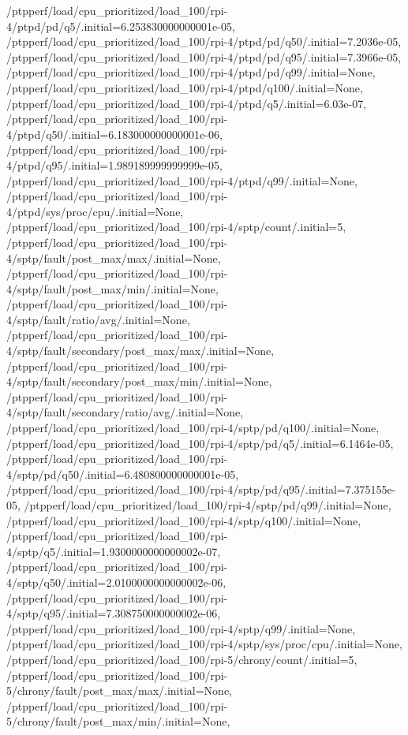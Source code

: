 {    /ptpperf/load/cpu_prioritized/load_100/rpi-4/ptpd/pd/q5/.initial=6.253830000000001e-05,
    /ptpperf/load/cpu_prioritized/load_100/rpi-4/ptpd/pd/q50/.initial=7.2036e-05,
    /ptpperf/load/cpu_prioritized/load_100/rpi-4/ptpd/pd/q95/.initial=7.3966e-05,
    /ptpperf/load/cpu_prioritized/load_100/rpi-4/ptpd/pd/q99/.initial=None,
    /ptpperf/load/cpu_prioritized/load_100/rpi-4/ptpd/q100/.initial=None,
    /ptpperf/load/cpu_prioritized/load_100/rpi-4/ptpd/q5/.initial=6.03e-07,
    /ptpperf/load/cpu_prioritized/load_100/rpi-4/ptpd/q50/.initial=6.183000000000001e-06,
    /ptpperf/load/cpu_prioritized/load_100/rpi-4/ptpd/q95/.initial=1.989189999999999e-05,
    /ptpperf/load/cpu_prioritized/load_100/rpi-4/ptpd/q99/.initial=None,
    /ptpperf/load/cpu_prioritized/load_100/rpi-4/ptpd/sys/proc/cpu/.initial=None,
    /ptpperf/load/cpu_prioritized/load_100/rpi-4/sptp/count/.initial=5,
    /ptpperf/load/cpu_prioritized/load_100/rpi-4/sptp/fault/post_max/max/.initial=None,
    /ptpperf/load/cpu_prioritized/load_100/rpi-4/sptp/fault/post_max/min/.initial=None,
    /ptpperf/load/cpu_prioritized/load_100/rpi-4/sptp/fault/ratio/avg/.initial=None,
    /ptpperf/load/cpu_prioritized/load_100/rpi-4/sptp/fault/secondary/post_max/max/.initial=None,
    /ptpperf/load/cpu_prioritized/load_100/rpi-4/sptp/fault/secondary/post_max/min/.initial=None,
    /ptpperf/load/cpu_prioritized/load_100/rpi-4/sptp/fault/secondary/ratio/avg/.initial=None,
    /ptpperf/load/cpu_prioritized/load_100/rpi-4/sptp/pd/q100/.initial=None,
    /ptpperf/load/cpu_prioritized/load_100/rpi-4/sptp/pd/q5/.initial=6.1464e-05,
    /ptpperf/load/cpu_prioritized/load_100/rpi-4/sptp/pd/q50/.initial=6.480800000000001e-05,
    /ptpperf/load/cpu_prioritized/load_100/rpi-4/sptp/pd/q95/.initial=7.375155e-05,
    /ptpperf/load/cpu_prioritized/load_100/rpi-4/sptp/pd/q99/.initial=None,
    /ptpperf/load/cpu_prioritized/load_100/rpi-4/sptp/q100/.initial=None,
    /ptpperf/load/cpu_prioritized/load_100/rpi-4/sptp/q5/.initial=1.9300000000000002e-07,
    /ptpperf/load/cpu_prioritized/load_100/rpi-4/sptp/q50/.initial=2.0100000000000002e-06,
    /ptpperf/load/cpu_prioritized/load_100/rpi-4/sptp/q95/.initial=7.308750000000002e-06,
    /ptpperf/load/cpu_prioritized/load_100/rpi-4/sptp/q99/.initial=None,
    /ptpperf/load/cpu_prioritized/load_100/rpi-4/sptp/sys/proc/cpu/.initial=None,
    /ptpperf/load/cpu_prioritized/load_100/rpi-5/chrony/count/.initial=5,
    /ptpperf/load/cpu_prioritized/load_100/rpi-5/chrony/fault/post_max/max/.initial=None,
    /ptpperf/load/cpu_prioritized/load_100/rpi-5/chrony/fault/post_max/min/.initial=None,
}

